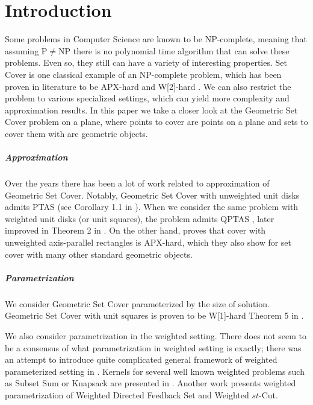 \chapter{Introduction}

Some problems in Computer Science are known to be NP-complete,
meaning that assuming P$\neq$NP there is no polynomial time
algorithm that can solve these problems.
Even so, they still can have a variety of interesting properties.
Set Cover is one classical example of an NP-complete problem,
which has been proven
in literature to be APX-hard and W[2]-hard \cite{platypus_book}.
We can also restrict the problem to various specialized settings,
which can yield more complexity and approximation results.
In this paper we take a closer look at the Geometric Set Cover problem
on a plane, where points to cover are points on a plane
and sets to cover them with are geometric objects.

\paragraph{Approximation}
Over the years there has been a lot of work related to approximation
of Geometric Set Cover. Notably,
Geometric Set Cover with unweighted unit disks admits PTAS (see
Corollary 1.1 in \cite{unit_disks}). When we consider the same problem
with weighted unit disks (or unit squares), the problem admits QPTAS
\cite{settling_apx_hardness}, later improved in
Theorem 2 in \cite{voronoi_true}.
On the other hand, \cite{rectangles_apx_hard} 
proves that cover with unweighted axis-parallel rectangles
is APX-hard, which they also show for set cover with many other
standard geometric objects.

\paragraph{Parametrization}
We consider Geometric Set Cover 
parameterized by the size of solution.
Geometric Set Cover with unit squares is proven to be W[1]-hard 
Theorem 5 in \cite{marx05}.

We also consider parametrization in the weighted setting.
There does not seem to be a consensus of what parametrization
in weighted setting is exactly; there
was an attempt to introduce quite complicated general
framework of weighted parameterized setting in \cite{weighted_framework}.
Kernels for several well known weighted problems
such as Subset Sum or Knapsack are presented in \cite{kernel_weighted}.
Another work \cite{weighted_flow} presents weighted
parametrization of Weighted Directed Feedback Set and Weighted $st$-Cut.

